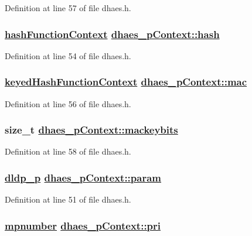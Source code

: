 Definition at line 57 of file dhaes.h.\hypertarget{structdhaes__pContext_o3}{
\subsubsection[hash]{\setlength{\rightskip}{0pt plus 5cm}\hyperlink{structhashFunctionContext}{hash\-Function\-Context} \hyperlink{structdhaes__pContext_o3}{dhaes\_\-p\-Context::hash}}}
\label{structdhaes__pContext_o3}


Definition at line 54 of file dhaes.h.\hypertarget{structdhaes__pContext_o5}{
\subsubsection[mac]{\setlength{\rightskip}{0pt plus 5cm}\hyperlink{structkeyedHashFunctionContext}{keyed\-Hash\-Function\-Context} \hyperlink{structdhaes__pContext_o5}{dhaes\_\-p\-Context::mac}}}
\label{structdhaes__pContext_o5}


Definition at line 56 of file dhaes.h.\hypertarget{structdhaes__pContext_o7}{
\subsubsection[mackeybits]{\setlength{\rightskip}{0pt plus 5cm}size\_\-t \hyperlink{structdhaes__pContext_o7}{dhaes\_\-p\-Context::mackeybits}}}
\label{structdhaes__pContext_o7}


Definition at line 58 of file dhaes.h.\hypertarget{structdhaes__pContext_o0}{
\subsubsection[param]{\setlength{\rightskip}{0pt plus 5cm}\hyperlink{structdldp__p}{dldp\_\-p} \hyperlink{structdhaes__pContext_o0}{dhaes\_\-p\-Context::param}}}
\label{structdhaes__pContext_o0}


Definition at line 51 of file dhaes.h.\hypertarget{structdhaes__pContext_o2}{
\subsubsection[pri]{\setlength{\rightskip}{0pt plus 5cm}\hyperlink{structmpnumber}{mpnumber} \hyperlink{structdhaes__pContext_o2}{dhaes\_\-p\-Context::pri}}}
\label{structdhaes__pContext_o2}


